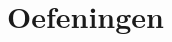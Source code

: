\documentclass[main.tex]{subfiles}
\begin{document}
\chapter{Oefeningen}
\label{cha:oefeningen}
\end{document}
